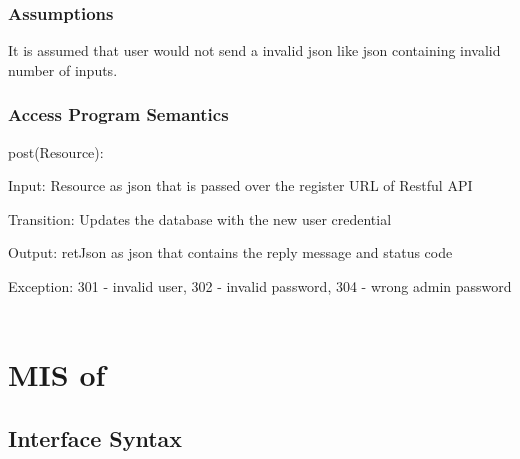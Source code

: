 \documentclass[12,english]{article}
\begin{document}
			\subsubsection{Assumptions}
           It is assumed that user would not send a invalid json like json containing invalid number of inputs.
        
			\subsubsection{Access Program Semantics}
			post(Resource):
			
			Input: Resource as json that is passed over the register URL of Restful API
			
			Transition: Updates the database with the new user credential
			
			Output: retJson as json that contains the reply message and status code
			
			Exception: 301 - invalid user, 302 - invalid password, 304 - wrong admin password\\
			\\
			
			
			
	\section{MIS of }
		\subsection{Interface Syntax}
\end{document}
